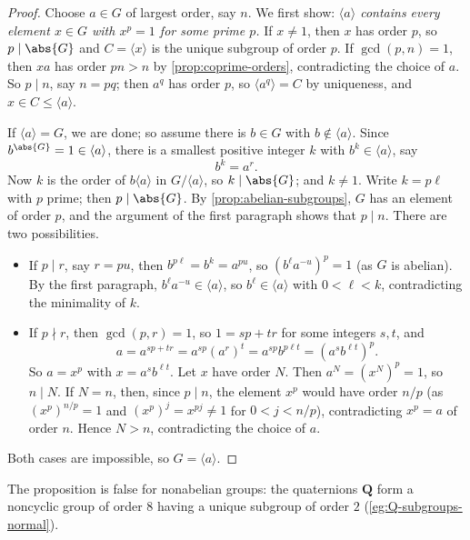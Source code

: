 \begin{proof}
	Choose \(a \in G\) of largest order, say \(n\). We first show:
	\emph{\(\langle a\rangle\) contains every element \(x \in G\) with \(x^p = 1\) for some
		prime \(p\).} If \(x \neq 1\), then \(x\) has order \(p\), so \(p \mid \abs{G}\) and
	\(C = \langle x\rangle\) is the unique subgroup of order \(p\). If \(\gcd(p, n) = 1\),
	then \(xa\) has order \(pn > n\) by \autoref{prop:coprime-orders}, contradicting the
	choice of \(a\). So \(p \mid n\), say \(n = pq\); then \(a^q\) has order \(p\), so
	\(\langle a^q\rangle = C\) by uniqueness, and \(x \in C \leq \langle a\rangle\).

	If \(\langle a\rangle = G\), we are done; so assume there is \(b \in G\) with
	\(b \notin \langle a\rangle\). Since \(b^{\abs{G}} = 1 \in \langle a\rangle\), there is a
	smallest positive integer \(k\) with \(b^k \in \langle a\rangle\), say
	\[
		b^k = a^r.
	\]
	Now \(k\) is the order of \(b\langle a\rangle\) in \(G/\langle a\rangle\), so
	\(k \mid \abs{G}\); and \(k \neq 1\). Write \(k = p\ell\) with \(p\) prime; then
	\(p \mid \abs{G}\). By \autoref{prop:abelian-subgroups}, \(G\) has an element of order
	\(p\), and the argument of the first paragraph shows that \(p \mid n\). There are two
	possibilities.
	\begin{itemize}
		\item If \(p \mid r\), say \(r = pu\), then \(b^{p\ell} = b^k = a^{pu}\), so
		      \((b^\ell a^{-u})^p = 1\) (as \(G\) is abelian). By the first paragraph,
		      \(b^\ell a^{-u} \in \langle a\rangle\), so \(b^\ell \in \langle a\rangle\) with
		      \(0 < \ell < k\), contradicting the minimality of \(k\).
		\item If \(p \nmid r\), then \(\gcd(p, r) = 1\), so \(1 = sp + tr\) for some
		      integers \(s, t\), and
		      \[
			      a = a^{sp + tr} = a^{sp}(a^r)^t = a^{sp}b^{p\ell t} = (a^sb^{\ell t})^p.
		      \]
		      So \(a = x^p\) with \(x = a^sb^{\ell t}\). Let \(x\) have order \(N\). Then
		      \(a^N = (x^N)^p = 1\), so \(n \mid N\). If \(N = n\), then, since \(p \mid n\),
		      the element \(x^p\) would have order \(n/p\) (as \((x^p)^{n/p} = 1\) and
		      \((x^p)^j = x^{pj} \neq 1\) for \(0 < j < n/p\)), contradicting
		      \(x^p = a\) of order \(n\). Hence \(N > n\), contradicting the choice of \(a\).
	\end{itemize}
	Both cases are impossible, so \(G = \langle a\rangle\).
\end{proof}

The proposition is false for nonabelian groups: the quaternions \(\mathbf Q\) form a
noncyclic group of order \(8\) having a unique subgroup of order \(2\)
(\autoref{eg:Q-subgroups-normal}).

